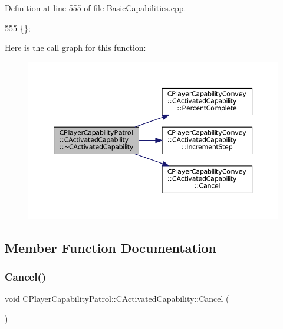 Definition at line 555 of file Basic\+Capabilities.\+cpp.


\begin{DoxyCode}
555 \{\};
\end{DoxyCode}
Here is the call graph for this function\+:
\nopagebreak
\begin{figure}[H]
\begin{center}
\leavevmode
\includegraphics[width=350pt]{classCPlayerCapabilityPatrol_1_1CActivatedCapability_a2ad25677321b38e90d4e94abb0401aab_cgraph}
\end{center}
\end{figure}


\subsection{Member Function Documentation}
\hypertarget{classCPlayerCapabilityPatrol_1_1CActivatedCapability_a36165c232eb283ce4a92bd4606480c73}{}\label{classCPlayerCapabilityPatrol_1_1CActivatedCapability_a36165c232eb283ce4a92bd4606480c73} 
\subsubsection{\texorpdfstring{Cancel()}{Cancel()}}
{\footnotesize\ttfamily void C\+Player\+Capability\+Patrol\+::\+C\+Activated\+Capability\+::\+Cancel (\begin{DoxyParamCaption}{ }\end{DoxyParamCaption})\hspace{0.3cm}{\ttfamily [virtual]}}



